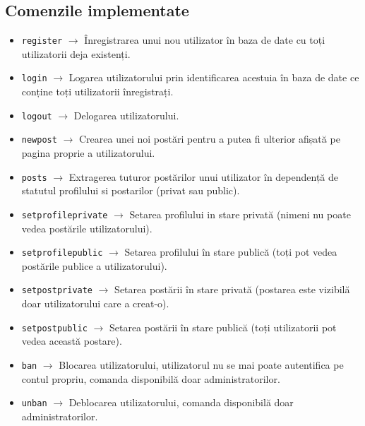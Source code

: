 \documentclass{article}
\begin{document}
\subsection{Comenzile implementate}
\begin{itemize}

    \item \texttt{register} $\rightarrow$ Înregistrarea unui nou utilizator în baza de date cu toți utilizatorii deja existenți.

    \item \texttt{login} $\rightarrow$ Logarea utilizatorului prin identificarea acestuia în baza de date ce conține toți utilizatorii înregistrați.

    \item \texttt{logout} $\rightarrow$ Delogarea utilizatorului.

    \item \texttt{new\textunderscore post} $\rightarrow$ Crearea unei noi postări pentru a putea fi ulterior afișată pe pagina proprie a utilizatorului.

    \item \texttt{posts} $\rightarrow$ Extragerea tuturor postărilor unui utilizator în dependență de statutul profilului si postarilor (privat sau public).

    \item \texttt{setprofile\textunderscore private} $\rightarrow$ Setarea profilului in stare privată (nimeni nu poate vedea postările utilizatorului).

    \item \texttt{setprofile\textunderscore public} $\rightarrow$ Setarea profilului în stare publică (toți pot vedea postările publice a utilizatorului).

    \item \texttt{setpost\textunderscore private} $\rightarrow$ Setarea postării în stare privată (postarea este vizibilă doar utilizatorului care a creat-o).

    \item \texttt{setpost\textunderscore public} $\rightarrow$ Setarea postării în stare publică (toți utilizatorii pot vedea această postare).

    \item \texttt{ban} $\rightarrow$ Blocarea utilizatorului, utilizatorul nu se mai poate autentifica pe contul propriu, comanda disponibilă doar administratorilor.

    \item \texttt{unban} $\rightarrow$ Deblocarea utilizatorului, comanda disponibilă doar administratorilor.


\end{itemize}
\end{document}
